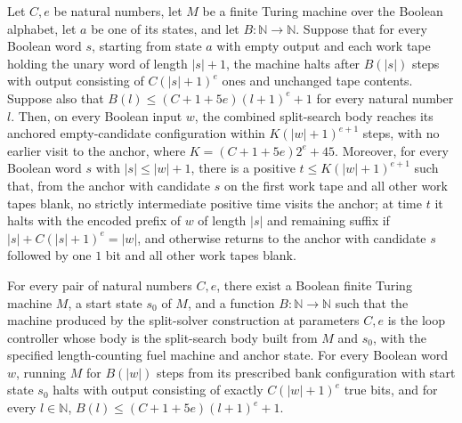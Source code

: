 \begin{theorem}
\label{Turing.FinTM.split_hyps}
\leanok
{}
Let $C,e$ be natural numbers, let $M$ be a finite Turing machine over the Boolean
alphabet, let $a$ be one of its states, and let $B:\mathbb{N}\to\mathbb{N}$. Suppose
that for every Boolean word $s$, starting from state $a$ with empty output and each work
tape holding the unary word of length $|s|+1$, the machine halts after $B(|s|)$ steps
with output consisting of $C(|s|+1)^e$ ones and unchanged tape contents. Suppose also
that $B(l)\le (C+1+5e)(l+1)^e+1$ for every natural number $l$. Then, on every Boolean
input $w$, the combined split-search body reaches its anchored empty-candidate
configuration within $K(|w|+1)^{e+1}$ steps, with no earlier visit to the anchor, where
$K=(C+1+5e)2^e+45$. Moreover, for every Boolean word $s$ with $|s|\le |w|+1$, there is a
positive $t\le K(|w|+1)^{e+1}$ such that, from the anchor with candidate $s$ on the
first work tape and all other work tapes blank, no strictly intermediate positive time
visits the anchor; at time $t$ it halts with the encoded prefix of $w$ of length $|s|$
and remaining suffix if $|s|+C(|s|+1)^e=|w|$, and otherwise returns to the anchor with
candidate $s$ followed by one $1$ bit and all other work tapes blank.
\end{theorem}

\begin{theorem}
\label{Turing.FinTM.split_sources}
\leanok
{}
For every pair of natural numbers $C,e$, there exist a Boolean finite Turing machine
$M$, a start state $s_0$ of $M$, and a function $B\colon\mathbb{N}\to\mathbb{N}$ such
that the machine produced by the split-solver construction at parameters $C,e$ is the
loop controller whose body is the split-search body built from $M$ and $s_0$, with the
specified length-counting fuel machine and anchor state. For every Boolean word $w$,
running $M$ for $B(|w|)$ steps from its prescribed bank configuration with start state
$s_0$ halts with output consisting of exactly $C(|w|+1)^e$ true bits, and for every
$l\in\mathbb{N}$, $B(l)\le (C+1+5e)(l+1)^e+1$.
\end{theorem}

